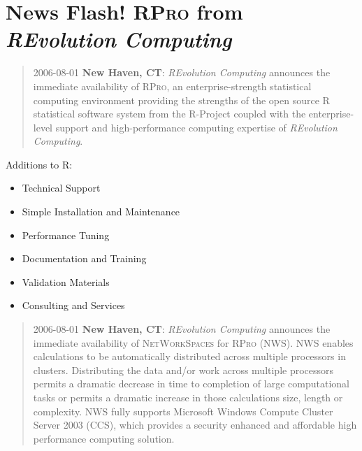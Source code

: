 \documentclass{asaproc}
\begin{document}
\section{News Flash! \textsc{RPro} from \emph{REvolution Computing} }

\begin{quote}
  2006-08-01 {\bf New Haven, CT}: \emph{REvolution Computing}
  announces the immediate availability of \textsc{RPro}, an enterprise-strength
  statistical computing environment providing the strengths of the
  open source \textsc{R} statistical software system from the R-Project coupled
  with the enterprise-level support and high-performance computing
  expertise of \emph{REvolution Computing}.
\end{quote}

  \vspace{1em}

  Additions to \textsc{R}:
      
      \begin{itemize}
        
      \item Technical Support
        
      \item Simple Installation and Maintenance
        
      \item Performance Tuning
        
      \item Documentation and Training
        
      \item Validation Materials
        
      \item Consulting and Services
        
      \end{itemize}
    
\begin{quote}

  2006-08-01 {\bf New Haven, CT}: \emph{REvolution Computing}
  announces the immediate availability of \textsc{NetWorkSpaces} for
  \textsc{RPro} (\textsc{NWS}). \textsc{NWS} enables calculations to
  be automatically distributed across multiple processors in clusters.
  Distributing the data and/or work across multiple processors permits
  a dramatic decrease in time to completion of large computational
  tasks or permits a dramatic increase in those calculations size,
  length or complexity.  \textsc{NWS} fully supports Microsoft Windows
  Compute Cluster Server 2003 (\textsc{CCS}), which provides a
  security enhanced and affordable high performance computing
  solution.

\end{quote}
\end{document}
